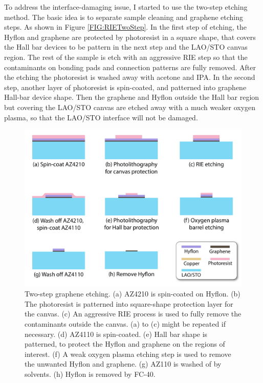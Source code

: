 \documentclass[pdflatex, sectionletters, 12pt]{pittetd}    %
\begin{document}
To address the interface-damaging issue, I started to use the two-step etching method. The basic idea is to separate sample cleaning and graphene etching steps. As shown in Figure \ref{FIG:RIETwoStep}. In the first step of etching, the Hyflon and graphene are protected by photoresist in a square shape, that covers the Hall bar devices to be pattern in the next step and the LAO/STO canvas region. The rest of the sample is etch with an aggressive RIE step so that the contaminants on bonding pads and connection patterns are fully removed. After the etching the photoresist is washed away with acetone and IPA. In the second step, another layer of photoresist is spin-coated, and patterned into graphene Hall-bar device shape. Then the graphene and Hyflon outside the Hall bar region but covering the LAO/STO canvas are etched away with a much weaker oxygen plasma, so that the LAO/STO interface will not be damaged.

\begin{figure}[p]
	\centering
	\includegraphics[width=.8\textwidth]{Drawing/TwoStepEtching.pdf}
	\caption{Two-step graphene etching. (a) AZ4210 is spin-coated on Hyflon. (b) The photoresist is patterned into square-shape protection layer for the canvas. (c) An aggressive RIE process is used to fully remove the contaminants outside the canvas. (a) to (c) might be repeated if necessary. (d) AZ4110 is spin-coated. (e) Hall bar shape is patterned, to protect the Hyflon and graphene on the regions of interest. (f) A weak oxygen plasma etching step is used to remove the unwanted Hyflon and graphene. (g) AZ110 is washed of by solvents. (h) Hyflon is removed by FC-40.}
	\label{FIG:TwoStepEtching}
\end{figure}
\end{document}
